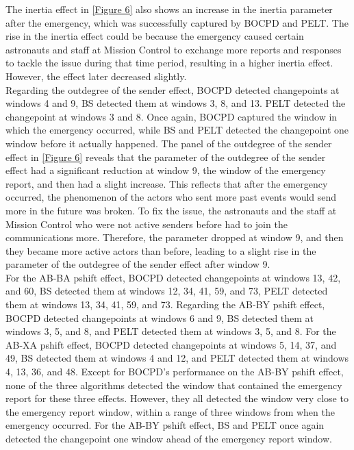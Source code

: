 \documentclass[]{interact}
\theoremstyle{plain}%
\theoremstyle{definition}
\theoremstyle{remark}
\begin{document}
{	The inertia effect in \autoref{Figure 6} also shows an increase in the inertia parameter after the emergency, which was successfully captured by BOCPD and PELT. The rise in the inertia effect could be because the emergency caused certain astronauts and staff at Mission Control to exchange more reports and responses to tackle the issue during that time period, resulting in a higher inertia effect. However, the effect later decreased slightly. \\ 
	 
	Regarding the outdegree of the sender effect, BOCPD detected changepoints at windows 4 and 9, BS detected them at windows 3, 8, and 13. PELT detected the changepoint at windows 3 and 8. Once again, BOCPD captured the window in which the emergency occurred, while BS and PELT detected the changepoint one window before it actually happened. The panel of the outdegree of the sender effect in \autoref{Figure 6} reveals that the parameter of the outdegree of the sender effect had a significant reduction at window 9, the window of the emergency report, and then had a slight increase. This reflects that after the emergency occurred, the phenomenon of the actors who sent more past events would send more in the future was broken. To fix the issue, the astronauts and the staff at Mission Control who were not active senders before had to join the communications more. Therefore, the parameter dropped at window 9, and then they became more active actors than before, leading to a slight rise in the parameter of the outdegree of the sender effect after window 9. \\
	  
    For the AB-BA pshift effect, BOCPD detected changepoints at windows 13, 42, and 60, BS detected them at windows 12, 34, 41, 59, and 73, PELT detected them at windows 13, 34, 41, 59, and 73. Regarding the AB-BY pshift effect, BOCPD detected changepoints at windows 6 and 9, BS detected them at windows 3, 5, and 8, and PELT detected them at windows 3, 5, and 8. For the AB-XA pshift effect, BOCPD detected changepoints at windows 5, 14, 37, and 49, BS detected them at windows 4 and 12, and PELT detected them at windows 4, 13, 36, and 48. Except for BOCPD's performance on the AB-BY pshift effect, none of the three algorithms detected the window that contained the emergency report for these three effects. However, they all detected the window very close to the emergency report window, within a range of three windows from when the emergency occurred. For the AB-BY pshift effect, BS and PELT once again detected the changepoint one window ahead of the emergency report window. \\
	  
}
\end{document}

